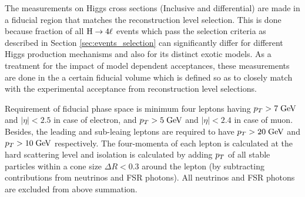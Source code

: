 The measurements on Higgs cross sections (Inclusive and differential) are made in a fiducial region that matches the reconstruction level selection.
This is done because fraction of all $\mathrm{H}\rightarrow4\ell$ events which pass the selection criteria as described in Section \ref{sec:events_selection} can significantly differ for different Higgs production mechanisms and also for its distinct exotic  models.
As a treatment for the impact of model dependent acceptances, these measurements are done in the a certain fiducial volume which is defined so as to closely match with the experimental acceptance from reconstruction level selections. %



\par 
Requirement of fiducial phase space is minimum four leptons having $p_T>7 \hbox{$\;\hbox{\rm GeV}$}$ and $|\eta|<2.5$ in case of electron, and $p_T>5 \hbox{$\;\hbox{\rm GeV}$}$ and $|\eta|<2.4$ in case of muon. Besides, the leading and sub-leaing leptons are required to have $p_T>20 \hbox{$\;\hbox{\rm GeV}$}$ and $p_T>10 \hbox{$\;\hbox{\rm GeV}$}$ respectively.
The four-momenta of each lepton is calculated at the hard scattering level and isolation is calculated by adding $p_T$ of all stable particles
within a cone size $\Delta R<0.3$ around the lepton (by subtracting contributions from neutrinos and FSR photons). All neutrinos and FSR photons are excluded from above summation. 
